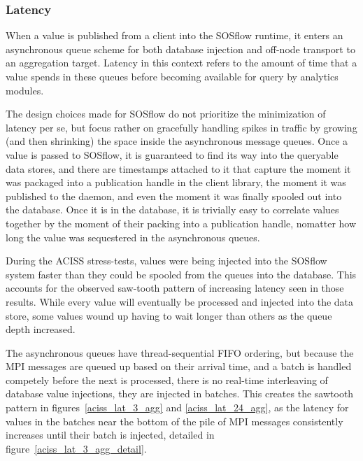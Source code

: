 \subsubsection{Latency} %
When a value is published from a client into the SOSflow runtime,
it enters an asynchronous queue scheme for both database injection
and off-node transport to an aggregation target.
%
Latency in this context refers to the amount of time that a value
spends in these queues before becoming available for query by
analytics modules.
%
\par
%
The design choices made for SOSflow do not prioritize the minimization
of latency per se, but focus rather on gracefully handling spikes in
traffic by growing (and then shrinking) the space inside the
asynchronous message queues.
%
Once a value is passed to SOSflow, it is guaranteed to find its
way into the queryable data stores, and there are timestamps attached
to it that capture the moment it was packaged into a publication handle in
the client library, the moment it was published to the daemon, and
even the moment it was finally spooled out into the database.
%
Once it is in the database, it is trivially easy to correlate values
together by the moment of their packing into a publication handle, nomatter
how long the value was sequestered in the asynchronous queues.
%
\par
%
During the ACISS stress-tests, values were being injected into the
SOSflow system faster than they could be spooled from the queues into
the database.  This accounts for the observed saw-tooth pattern of
increasing latency seen in those results.
%
While every value will eventually be processed and injected into the data
store, some values wound up having to wait longer than others as the queue
depth increased.
%
\par
%
The asynchronous queues have thread-sequential FIFO ordering, but
because the MPI messages are queued up based on their arrival time,
and a batch is handled competely before the next is processed, there
is no real-time interleaving of database value injections, they are
injected in batches.
%
This creates the sawtooth pattern in figures~\ref{aciss_lat_3_agg} and
\ref{aciss_lat_24_agg}, as the latency for values in the batches near
the bottom of the pile of MPI messages consistently increases until
their batch is injected, detailed in
figure~\ref{aciss_lat_3_agg_detail}.
%
%


